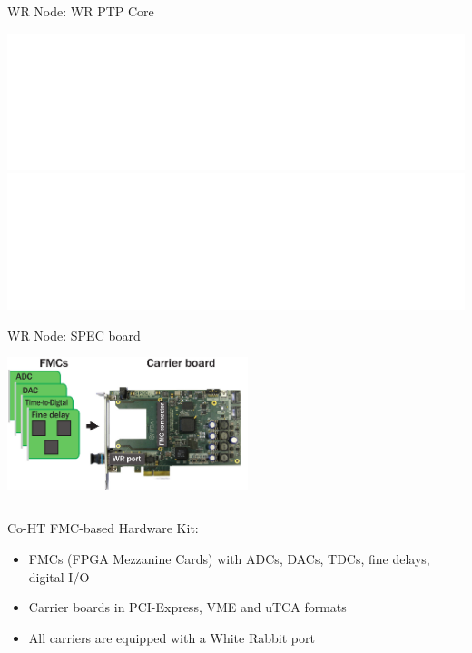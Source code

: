 \documentclass[compress,red]{beamer}
\begin{document}
\begin{frame}{WR Node: WR PTP Core}

    \begin{center}
    \includegraphics<1>[width=1.0\textwidth]{node/wrpc_box.pdf} \pause
    \includegraphics<2>[width=1.0\textwidth]{node/wrpc_inside.pdf}
    \end{center}

\end{frame}
\begin{frame}{WR Node: SPEC board}

    \begin{center}
    \includegraphics[width=7cm]{node/shw_kit-1}
    \end{center}

  \begin{columns}[c]

	\begin{block}{Co-HT FMC-based Hardware Kit:}
	  \begin{itemize}
	  \item FMCs (FPGA Mezzanine Cards) with ADCs, DACs, TDCs, fine delays, digital I/O
	  \item Carrier boards in PCI-Express, VME and uTCA formats
	  \item All carriers are equipped with a White Rabbit port
	  \end{itemize}
	\end{block}

  \end{columns}


\end{frame}
\end{document}
